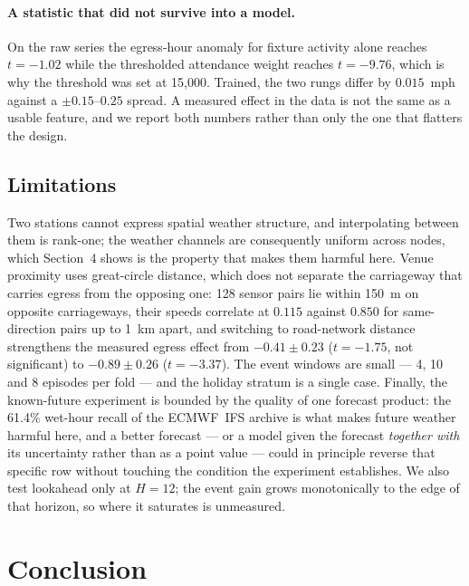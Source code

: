 \documentclass[letterpaper]{article}
\begin{document}
\paragraph{A statistic that did not survive into a model.} On the raw series the egress-hour anomaly for fixture activity alone reaches $t=-1.02$ while the thresholded attendance weight reaches $t=-9.76$, which is why the threshold was set at 15{,}000. Trained, the two rungs differ by $0.015$~mph against a $\pm0.15$--$0.25$ spread. A measured effect in the data is not the same as a usable feature, and we report both numbers rather than only the one that flatters the design.

\subsection{Limitations}

Two stations cannot express spatial weather structure, and interpolating between them is rank-one; the weather channels are consequently uniform across nodes, which Section~4 shows is the property that makes them harmful here. Venue proximity uses great-circle distance, which does not separate the carriageway that carries egress from the opposing one: 128 sensor pairs lie within 150~m on opposite carriageways, their speeds correlate at $0.115$ against $0.850$ for same-direction pairs up to 1~km apart, and switching to road-network distance strengthens the measured egress effect from $-0.41\pm0.23$ ($t=-1.75$, not significant) to $-0.89\pm0.26$ ($t=-3.37$). The event windows are small --- 4, 10 and 8 episodes per fold --- and the holiday stratum is a single case. Finally, the known-future experiment is bounded by the quality of one forecast product: the 61.4\% wet-hour recall of the ECMWF~IFS archive is what makes future weather harmful here, and a better forecast --- or a model given the forecast \emph{together with} its uncertainty rather than as a point value --- could in principle reverse that specific row without touching the condition the experiment establishes. We also test lookahead only at $H=12$; the event gain grows monotonically to the edge of that horizon, so where it saturates is unmeasured.

\section{Conclusion}
\end{document}
